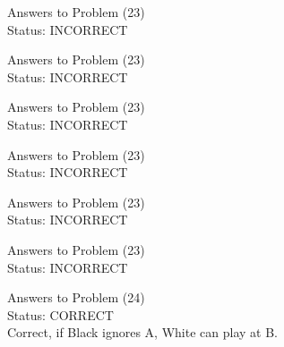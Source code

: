 \documentclass[11pt]{article}
\begin{document}
\begin{minipage}[t]{0.5\textwidth}
  {\centering
  
  Answers to Problem (23)\\
  Status: INCORRECT\\
  
  }
\end{minipage}
\begin{minipage}[t]{0.5\textwidth}
  {\centering
  
  Answers to Problem (23)\\
  Status: INCORRECT\\
  
  }
\end{minipage}
\begin{minipage}[t]{0.5\textwidth}
  {\centering
  
  Answers to Problem (23)\\
  Status: INCORRECT\\
  
  }
\end{minipage}
\begin{minipage}[t]{0.5\textwidth}
  {\centering
  
  Answers to Problem (23)\\
  Status: INCORRECT\\
  
  }
\end{minipage}
\begin{minipage}[t]{0.5\textwidth}
  {\centering
  
  Answers to Problem (23)\\
  Status: INCORRECT\\
  
  }
\end{minipage}
\begin{minipage}[t]{0.5\textwidth}
  {\centering
  
  Answers to Problem (23)\\
  Status: INCORRECT\\
  
  }
\end{minipage}
\begin{minipage}[t]{0.5\textwidth}
  {\centering
  
  Answers to Problem (24)\\
  Status: CORRECT\\
  Correct, if Black ignores A, White can play at B.\\
  }
\end{minipage}
\end{document}
